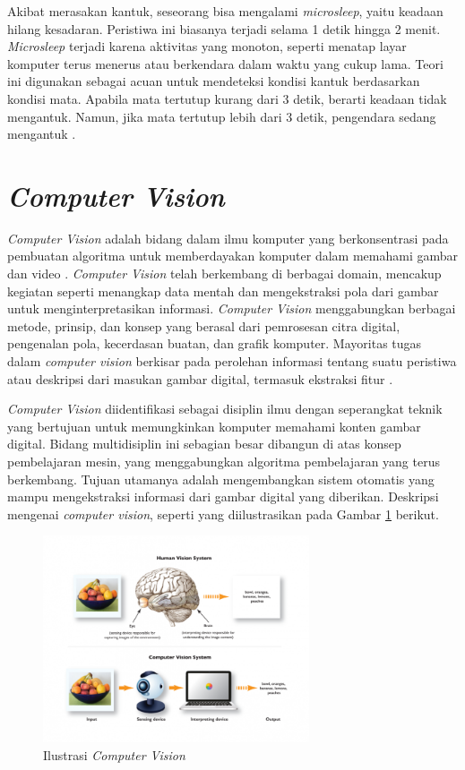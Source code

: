     Akibat merasakan kantuk, seseorang bisa mengalami \textit{microsleep}, yaitu keadaan hilang kesadaran. Peristiwa ini biasanya terjadi selama 1 detik hingga 2 menit. \textit{Microsleep} terjadi karena aktivitas yang monoton, seperti menatap layar komputer terus menerus atau berkendara dalam waktu yang cukup lama. Teori ini digunakan sebagai acuan untuk mendeteksi kondisi kantuk berdasarkan kondisi mata. Apabila mata tertutup kurang dari 3 detik, berarti keadaan tidak mengantuk. Namun, jika mata tertutup lebih dari 3 detik, pengendara sedang mengantuk \cite{puteri2020deteksi}.

\section{\textit{Computer Vision}}

    \textit{Computer Vision} adalah bidang dalam ilmu komputer yang berkonsentrasi pada pembuatan algoritma untuk memberdayakan komputer dalam memahami gambar dan video \cite{Guntara2023}. \textit{Computer Vision }telah berkembang di berbagai domain, mencakup kegiatan seperti menangkap data mentah dan mengekstraksi pola dari gambar untuk menginterpretasikan informasi. \textit{Computer Vision} menggabungkan berbagai metode, prinsip, dan konsep yang berasal dari pemrosesan citra digital, pengenalan pola, kecerdasan buatan, dan grafik komputer. Mayoritas tugas dalam \textit{computer vision} berkisar pada perolehan informasi tentang suatu peristiwa atau deskripsi dari masukan gambar digital, termasuk ekstraksi fitur \cite{Noerifanza2022}. 


    \textit{Computer Vision} diidentifikasi sebagai disiplin ilmu dengan seperangkat teknik yang bertujuan untuk memungkinkan komputer memahami konten gambar digital. Bidang multidisiplin ini sebagian besar dibangun di atas konsep pembelajaran mesin, yang menggabungkan algoritma pembelajaran yang terus berkembang. Tujuan utamanya adalah mengembangkan sistem otomatis yang mampu mengekstraksi informasi dari gambar digital yang diberikan.  Deskripsi mengenai \textit{computer vision}, seperti yang diilustrasikan pada Gambar \ref{Konsep Dasar Computer Vision} \cite{Guntara2023} berikut.


    \begin{figure}[H]
        \centering
        \includegraphics[width=0.7\textwidth]{figures/bab2/computer vision.jpg}
        \caption{Ilustrasi \textit{Computer Vision} \cite{ideas}}
        \label{Konsep Dasar Computer Vision}
    \end{figure}



